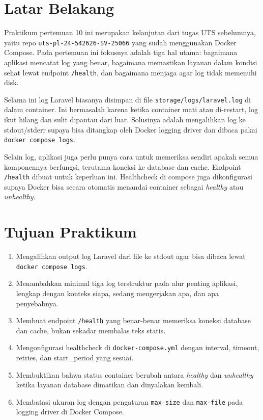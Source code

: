 \documentclass[a4paper,oneside,11pt]{book}
\begin{document}
\section{Latar Belakang}

Praktikum pertemuan 10 ini merupakan kelanjutan dari tugas UTS sebelumnya, yaitu repo
\texttt{uts-pl-24-542626-SV-25066} yang sudah menggunakan Docker Compose. Pada pertemuan ini
fokusnya adalah tiga hal utama: bagaimana aplikasi mencatat log yang benar, bagaimana
memastikan layanan dalam kondisi sehat lewat endpoint \texttt{/health}, dan bagaimana
menjaga agar log tidak memenuhi disk.

Selama ini log Laravel biasanya disimpan di file \texttt{storage/logs/laravel.log} di dalam
container. Ini bermasalah karena ketika container mati atau di-restart, log ikut hilang dan
sulit dipantau dari luar. Solusinya adalah mengalihkan log ke stdout/stderr supaya bisa
ditangkap oleh Docker logging driver dan dibaca pakai \texttt{docker compose logs}.

Selain log, aplikasi juga perlu punya cara untuk memeriksa sendiri apakah semua komponennya
berfungsi, terutama koneksi ke database dan cache. Endpoint \texttt{/health} dibuat untuk
keperluan ini. Healthcheck di compose juga dikonfigurasi supaya Docker bisa secara otomatis
menandai container sebagai \textit{healthy} atau \textit{unhealthy}.

\section{Tujuan Praktikum}

\begin{enumerate}
  \item Mengalihkan output log Laravel dari file ke stdout agar bisa dibaca lewat
        \texttt{docker compose logs}.
  \item Menambahkan minimal tiga log terstruktur pada alur penting aplikasi, lengkap dengan
        konteks siapa, sedang mengerjakan apa, dan apa penyebabnya.
  \item Membuat endpoint \texttt{/health} yang benar-benar memeriksa koneksi database dan cache,
        bukan sekadar membalas teks statis.
  \item Mengonfigurasi healthcheck di \texttt{docker-compose.yml} dengan interval, timeout,
        retries, dan start\_period yang sesuai.
  \item Membuktikan bahwa status container berubah antara \textit{healthy} dan \textit{unhealthy}
        ketika layanan database dimatikan dan dinyalakan kembali.
  \item Membatasi ukuran log dengan pengaturan \texttt{max-size} dan \texttt{max-file} pada
        logging driver di Docker Compose.
\end{enumerate}
\end{document}
